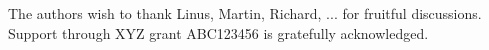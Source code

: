 
The authors wish to thank Linus, Martin, Richard, ... for fruitful discussions. Support through XYZ grant ABC123456 is gratefully acknowledged.
